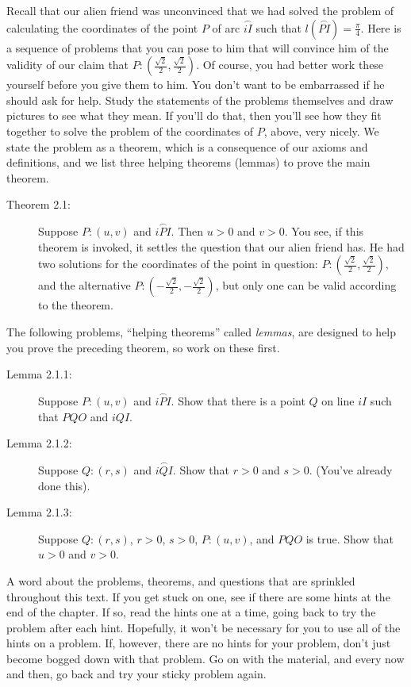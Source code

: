 \documentclass[english]{book}
\newcommand{\arc}[1]{\overset{\frown}{#1} }
\begin{document}
Recall that our alien friend was unconvinced that we had solved the problem of calculating the coordinates of the point $P$ of arc $\arc{iI}$ such that $l(\arc{PI}) = \frac{\pi}{4}$. Here is a sequence of problems that you can pose to him that will convince him of the validity of our claim that $P:(\frac{\sqrt{2}}{2}, \frac{\sqrt{2}}{2})$. Of course, you had better work these yourself before you give them to him. You don't want to be embarrassed if he should ask for help. Study the statements of the problems themselves and draw pictures to see what they mean. If you'll do that, then you'll see how they fit together to solve the problem of the coordinates of $P$, above, very nicely. We state the problem as a theorem, which is a consequence of our axioms and definitions, and we list three helping theorems (lemmas) to prove the main theorem.

\begin{description}

\item[Theorem 2.1:] Suppose $P:(u,v)$ and $\arc{iPI}$. Then $u>0$ and $v>0$. You see, if this theorem is invoked, it settles the question that our alien friend has. He had two solutions for the coordinates of the point in question: $P:(\frac{\sqrt{2}}{2}, \frac{\sqrt{2}}{2})$, and the alternative $P:(-\frac{\sqrt{2}}{2}, -\frac{\sqrt{2}}{2})$, but only one can be valid according to the theorem.

\end{description}

The following problems, ``helping theorems'' called \emph{lemmas}, are designed to help you prove the preceding theorem, so work on these first.

\begin{description}

\item[Lemma 2.1.1:] Suppose $P:(u,v)$ and $\arc{iPI}$. Show that there is a point $Q$ on line $iI$ such that $PQO$ and $iQI$.

\item[Lemma 2.1.2:] Suppose $Q:(r,s)$ and $\arc{iQI}$. Show that $r>0$ and $s>0$. (You've already done this).

\item[Lemma 2.1.3:] Suppose $Q:(r,s)$, $r>0$, $s>0$, $P:(u,v)$, and $PQO$ is true. Show that $u>0$ and $v>0$.

\end{description}

A word about the problems, theorems, and questions that are sprinkled throughout this text. If you get stuck on one, see if there are some hints at the end of the chapter. If so, read the hints one at a time, going back to try the problem after each hint. Hopefully, it won't be necessary for you to use all of the hints on a problem. If, however, there are no hints for your problem, don't just become bogged down with that problem. Go on with the material, and every now and then, go back and try your sticky problem again. 
\end{document}
